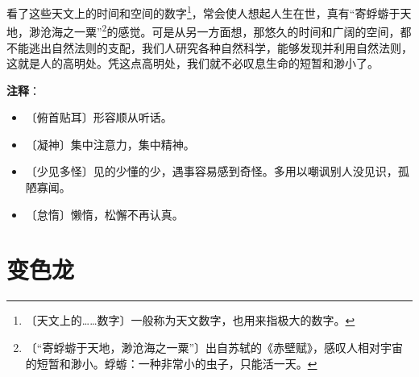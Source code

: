 \documentclass[12pt,UTF-8,openany]{ctexbook}
\begin{document}
\begin{large}
    看了这些天文上的时间和空间的数字\footnote{〔天文上的……数字〕一般称为天文数字，也用来指极大的数字。}，常会使人想起人生在世，真有“寄蜉蝣于天地，渺沧海之一粟”\footnote{〔“寄蜉蝣于天地，渺沧海之一粟”〕出自苏轼的《赤壁赋》，感叹人相对宇宙的短暂和渺小。蜉蝣：一种非常小的虫子，只能活一天。}的感觉。可是从另一方面想，那悠久的时间和广阔的空间，都不能逃出自然法则的支配，我们人研究各种自然科学，能够发现并利用自然法则，这就是人的高明处。凭这点高明处，我们就不必叹息生命的短暂和渺小了。
    
\end{large}


\newpage

\textbf{注释}：

\vspace{-1em}

\begin{itemize}
    \setlength\itemsep{-0.2em}
    \item 〔俯首贴耳〕形容顺从听话。
    \item 〔凝神〕集中注意力，集中精神。
    \item 〔少见多怪〕见的少懂的少，遇事容易感到奇怪。多用以嘲讽别人没见识，孤陋寡闻。
    \item 〔怠惰〕懒惰，松懈不再认真。
\end{itemize}

\chapter{变色龙}
\end{document}
